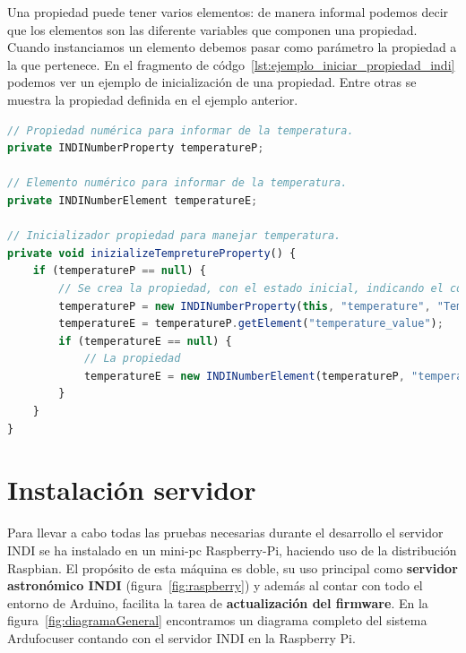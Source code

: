 Una propiedad puede tener varios elementos: de manera informal podemos decir que los elementos son las diferente variables que componen una propiedad. Cuando instanciamos un elemento debemos pasar como parámetro la propiedad a la que pertenece. En el fragmento de códgo~\ref{lst:ejemplo_iniciar_propiedad_indi} podemos ver un ejemplo de inicialización de una propiedad. Entre otras se muestra la propiedad definida en el ejemplo anterior.





\begin{lstlisting}[language=javascript, caption={Ejemplo iniciar una propieda INDI Numérica},label={lst:ejemplo_iniciar_propiedad_indi}]
// Propiedad numérica para informar de la temperatura.
private INDINumberProperty temperatureP;

// Elemento numérico para informar de la temperatura.
private INDINumberElement temperatureE;

// Inicializador propiedad para manejar temperatura.
private void inizializeTempretureProperty() {
	if (temperatureP == null) {
		// Se crea la propiedad, con el estado inicial, indicando el conjunto al que pertenece y si es escritura/lectura.
		temperatureP = new INDINumberProperty(this, "temperature", "Temperature", "Control", PropertyStates.IDLE, PropertyPermissions.RO);
		temperatureE = temperatureP.getElement("temperature_value");
		if (temperatureE == null) {
			// La propiedad 
			temperatureE = new INDINumberElement(temperatureP, "temperature", "Temperature", "1", "1", "99", "1", "%f");
		}
	}
}
\end{lstlisting}










\section{Instalación servidor}

Para llevar a cabo todas las pruebas necesarias durante el desarrollo el servidor INDI se ha instalado en un mini-pc Raspberry-Pi, haciendo uso de la distribución Raspbian. El propósito de esta máquina es doble, su uso principal como \textbf{servidor astronómico INDI} (figura~\ref{fig:raspberry}) y además al contar con todo el entorno de Arduino, facilita la tarea de \textbf{actualización del firmware}. En la figura~\ref{fig:diagramaGeneral} encontramos un diagrama completo del sistema Ardufocuser contando con el servidor INDI en la Raspberry Pi.

